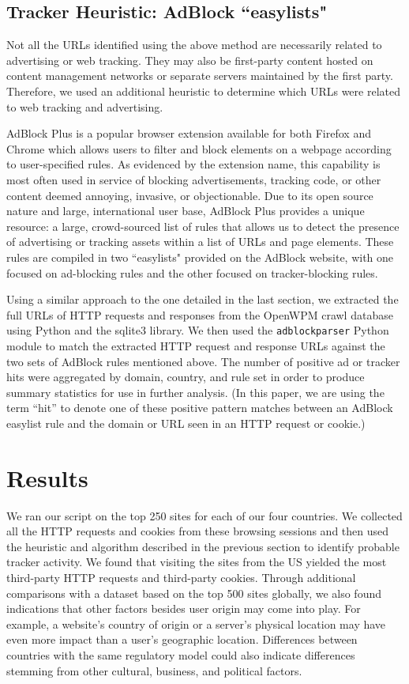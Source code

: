 \documentclass[conference]{IEEEtran}
\begin{document}
\subsection{Tracker Heuristic: AdBlock ``easylists"}

Not all the URLs identified using the above method are necessarily related to advertising or web tracking.  They may also be first-party content hosted on content management networks or separate servers maintained by the first party.  Therefore, we used an additional heuristic to determine which URLs were related to web tracking and advertising.  

AdBlock Plus \cite{adblock} is a popular browser extension available for both Firefox and Chrome which allows users to filter and block elements on a webpage according to user-specified rules. As evidenced by the extension name, this capability is most often used in service of blocking advertisements, tracking code, or other content deemed annoying, invasive, or objectionable. Due to its open source nature and large, international user base, AdBlock Plus provides a unique resource: a large, crowd-sourced list of rules that allows us to detect the presence of advertising or tracking assets within a list of URLs and page elements. These rules are compiled in two ``easylists"  \cite{easylist} provided on the AdBlock website, with one focused on ad-blocking rules and the other focused on tracker-blocking rules.

Using a similar approach to the one detailed in the last section, we extracted the full URLs of HTTP requests and responses from the OpenWPM crawl database using Python and the sqlite3 library. We then used the \texttt{adblockparser}  \cite{adblockparser} Python module to match the extracted HTTP request and response URLs against the two sets of AdBlock rules mentioned above. The number of positive ad or tracker hits were aggregated by domain, country, and rule set in order to produce summary statistics for use in further analysis. (In this paper, we are using the term ``hit'' to denote one of these positive pattern matches between an AdBlock easylist rule and the domain or URL seen in an HTTP request or cookie.)

\section{Results}
We ran our script on the top 250 sites for each of our four countries.  We collected all the HTTP requests and cookies from these browsing sessions and then used the heuristic and algorithm described in the previous section to identify probable tracker activity.  We found that visiting the sites from the US yielded the most third-party HTTP requests and third-party cookies. Through additional comparisons with a dataset based on the top 500 sites globally, we also found indications that other factors besides user origin may come into play. For example, a website's country of origin or a server's physical location may have even more impact than a user's geographic location. Differences between countries with the same regulatory model could also indicate differences stemming from other cultural, business, and political factors. 
\end{document}
